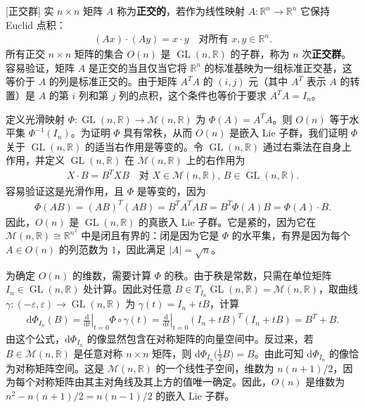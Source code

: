 \documentclass[../../main.tex]{subfiles}
\begin{document}
\begin{example}\label{example:ch07-27}[正交群]
实 $n\times n$ 矩阵 $A$ 称为\textbf{正交的}，若作为线性映射 $A\colon\mathbb{R}^n\to\mathbb{R}^n$ 它保持 Euclid 点积：
\begin{align*}
(Ax)\cdot(Ay)=x\cdot y\quad\text{对所有 }x,y\in\mathbb{R}^n.
\end{align*}
所有正交 $n\times n$ 矩阵的集合 $O(n)$ 是 $\operatorname{GL}(n,\mathbb{R})$ 的子群，称为 $n$ 次\textbf{正交群}。容易验证，矩阵 $A$ 是正交的当且仅当它将 $\mathbb{R}^n$ 的标准基映为一组标准正交基，这等价于 $A$ 的列是标准正交的。由于矩阵 $A^{T}A$ 的 $(i,j)$ 元（其中 $A^{T}$ 表示 $A$ 的转置）是 $A$ 的第 $i$ 列和第 $j$ 列的点积，这个条件也等价于要求 $A^{T}A=I_n$。

定义光滑映射 $\Phi\colon\operatorname{GL}(n,\mathbb{R})\to\mathcal{M}(n,\mathbb{R})$ 为 $\Phi(A)=A^{T}A$。则 $O(n)$ 等于水平集 $\Phi^{-1}(I_n)$。为证明 $\Phi$ 具有常秩，从而 $O(n)$ 是嵌入 Lie 子群，我们证明 $\Phi$ 关于 $\operatorname{GL}(n,\mathbb{R})$ 的适当右作用是等变的。令 $\operatorname{GL}(n,\mathbb{R})$ 通过右乘法在自身上作用，并定义 $\operatorname{GL}(n,\mathbb{R})$ 在 $\mathcal{M}(n,\mathbb{R})$ 上的右作用为
\begin{align*}
X\cdot B=B^{T}XB\quad\text{对 }X\in\mathcal{M}(n,\mathbb{R}),\,B\in\operatorname{GL}(n,\mathbb{R}).
\end{align*}
容易验证这是光滑作用，且 $\Phi$ 是等变的，因为
\begin{align*}
\Phi(AB)=(AB)^{T}(AB)=B^{T}A^{T}AB=B^{T}\Phi(A)B=\Phi(A)\cdot B.
\end{align*}
因此，$O(n)$ 是 $\operatorname{GL}(n,\mathbb{R})$ 的真嵌入 Lie 子群。它是紧的，因为它在 $\mathcal{M}(n,\mathbb{R})\cong\mathbb{R}^{n^2}$ 中是闭且有界的：闭是因为它是 $\Phi$ 的水平集，有界是因为每个 $A\in O(n)$ 的列范数为 $1$，因此满足 $|A|=\sqrt{n}$。

为确定 $O(n)$ 的维数，需要计算 $\Phi$ 的秩。由于秩是常数，只需在单位矩阵 $I_n\in\operatorname{GL}(n,\mathbb{R})$ 处计算。因此对任意 $B\in T_{I_n}\operatorname{GL}(n,\mathbb{R})=\mathcal{M}(n,\mathbb{R})$，取曲线 $\gamma\colon(-\varepsilon,\varepsilon)\to\operatorname{GL}(n,\mathbb{R})$ 为 $\gamma(t)=I_n+tB$，计算
\begin{align*}
\mathrm{d}\Phi_{I_n}(B)=\left.\frac{\mathrm{d}}{\mathrm{d}t}\right|_{t=0}\Phi\circ\gamma(t)=\left.\frac{\mathrm{d}}{\mathrm{d}t}\right|_{t=0}(I_n+tB)^{T}(I_n+tB)=B^{T}+B.
\end{align*}
由这个公式，$\mathrm{d}\Phi_{I_n}$ 的像显然包含在对称矩阵的向量空间中。反过来，若 $B\in\mathcal{M}(n,\mathbb{R})$ 是任意对称 $n\times n$ 矩阵，则 $\mathrm{d}\Phi_{I_n}\bigl(\frac{1}{2}B\bigr)=B$。由此可知 $\mathrm{d}\Phi_{I_n}$ 的像恰为对称矩阵空间。这是 $\mathcal{M}(n,\mathbb{R})$ 的一个线性子空间，维数为 $n(n+1)/2$，因为每个对称矩阵由其主对角线及其上方的值唯一确定。因此，$O(n)$ 是维数为 $n^2-n(n+1)/2=n(n-1)/2$ 的嵌入 Lie 子群。
\end{example}
\end{document}

